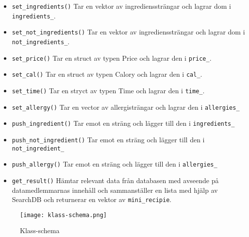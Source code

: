 \begin{itemize}
\item \verb+set_ingredients()+ Tar en vektor av ingredienssträngar och lagrar
  dom i \verb+ingredients_+.

\item \verb+set_not_ingredients()+ Tar en vektor av ingredienssträngar och lagrar
  dom i \verb+not_ingredients_+.

\item \verb+set_price()+ Tar en struct av typen Price och lagrar den i
  \verb+price_+.

\item \verb+set_cal()+ Tar en struct av typen Calory och lagrar den i \verb+cal_+.

\item \verb+set_time()+ Tar en stryct av typen Time och lagrar den i
  \verb+time_+.

\item \verb+set_allergy()+ Tar en vector av allergisträngar och lagrar den i
  \verb+allergies_+

\item \verb+push_ingredient()+ Tar emot en sträng och lägger till den i
  \verb+ingredients_+

\item \verb+push_not_ingredient()+ Tar emot en sträng och lägger till den i
  \verb+not_ingredient_+

\item \verb+push_allergy()+ Tar emot en sträng och lägger till den i \verb+allergies_+


\item \verb+get_result()+ Hämtar relevant data från databasen med avseende på
  datamedlemmarnas innehåll och sammanställer en lista  med hjälp av SearchDB och
  returnerar en vektor av \verb+mini_recipie+. 

\end{itemize}

\begin{figure}[h]
\centering
\texttt{[image: klass-schema.png]}
\caption{Klass-schema}
\label{fig:classes}
\end{figure}
